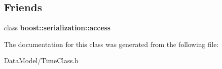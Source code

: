 \subsection*{Friends}
\begin{DoxyCompactItemize}
\item 
\hypertarget{classTimeClass_ac98d07dd8f7b70e16ccb9a01abf56b9c}{class {\bfseries boost\-::serialization\-::access}}\label{classTimeClass_ac98d07dd8f7b70e16ccb9a01abf56b9c}

\end{DoxyCompactItemize}


The documentation for this class was generated from the following file\-:\begin{DoxyCompactItemize}
\item 
Data\-Model/Time\-Class.\-h\end{DoxyCompactItemize}
